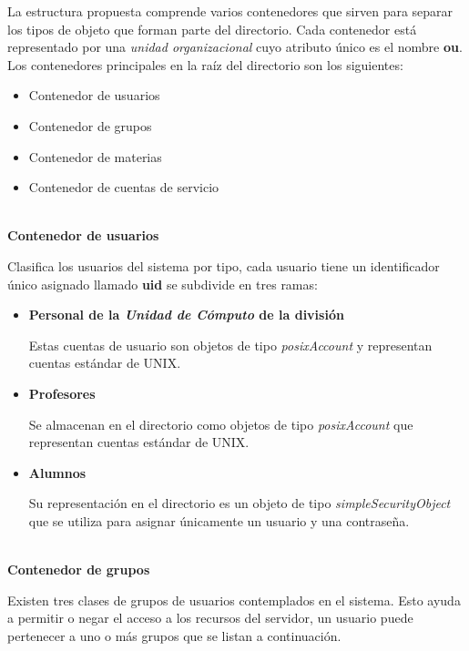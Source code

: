 La estructura propuesta comprende varios contenedores que sirven para separar los tipos de objeto que forman parte del directorio. Cada contenedor est\'{a} representado por una \textit{unidad organizacional} cuyo atributo \'{u}nico es el nombre \textbf{ou}. Los contenedores principales en la ra\'{i}z del directorio son los siguientes:

\begin{itemize}
  \item Contenedor de usuarios
  \item Contenedor de grupos
  \item Contenedor de materias
  \item Contenedor de cuentas de servicio
\end{itemize}

\newpage
\textbf{\\ Contenedor de usuarios \\}

Clasifica los usuarios del sistema por tipo, cada usuario tiene un identificador \'{u}nico asignado llamado \textbf{uid} se subdivide en tres ramas:

\begin{itemize}

  \item \textbf{Personal de la \textit{Unidad de C\'{o}mputo} de la divisi\'{o}n}

  Estas cuentas de usuario son objetos de tipo \textit{posixAccount} y representan cuentas est\'{a}ndar de \textsc{UNIX}.

  \item \textbf{Profesores}

  Se almacenan en el directorio como objetos de tipo \textit{posixAccount} que representan cuentas est\'{a}ndar de \textsc{UNIX}.

  \item \textbf{Alumnos}

  Su representaci\'{o}n en el directorio es un objeto de tipo \textit{simpleSecurityObject} que se utiliza para asignar \'{u}nicamente un usuario y una contrase\~{n}a.

\end{itemize}

\textbf{\\ Contenedor de grupos \\}

Existen tres clases de grupos de usuarios contemplados en el sistema. Esto ayuda a permitir o negar el acceso a los recursos del servidor, un usuario puede pertenecer a uno o m\'{a}s grupos que se listan a continuaci\'{o}n.

